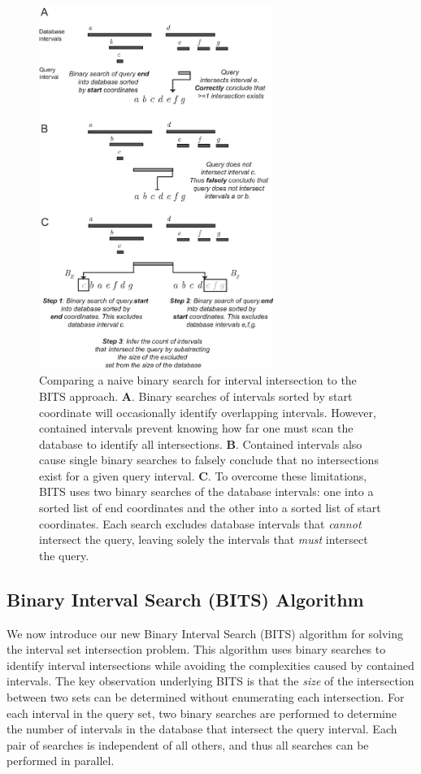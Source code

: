 \documentclass{bioinfo}
\begin{document}
\begin{figure}[h]
		\centering
		\includegraphics[width=3in]{Figure1.v3.eps}
		\caption{Comparing a naive binary search for interval 
		intersection to the BITS approach. \textbf{A}. Binary
		searches of intervals sorted by start coordinate will
		occasionally identify overlapping intervals. However,  
		contained intervals prevent knowing how far one must scan 
		the database to identify all intersections. \textbf{B}. Contained 
		intervals also cause single binary searches to 
		falsely conclude that no intersections exist for a given query 
		interval.  \textbf{C}. To overcome these limitations, BITS
		uses two binary searches of the database intervals: one
		into a sorted list of end coordinates and the other into a
		sorted list of start coordinates. Each search excludes database
		intervals that \emph{cannot} intersect the query, leaving solely the
		intervals that \emph{must} intersect the query.}
		\label{bitssearching}
\end{figure}

\subsection{Binary Interval Search (BITS) Algorithm}
We now introduce our new Binary Interval Search (BITS) algorithm for solving the
interval set intersection problem.  This algorithm uses binary searches to
identify interval intersections while avoiding the complexities
caused by contained intervals. The key observation underlying BITS 
is that the \emph{size} of the intersection between two sets can be determined 
without enumerating each intersection.  For each interval in the query set, two
binary searches are performed to determine the number of intervals in the
database that intersect the query interval.  Each pair of searches is
independent of all others, and thus all searches can be performed in parallel.  
\end{document}
